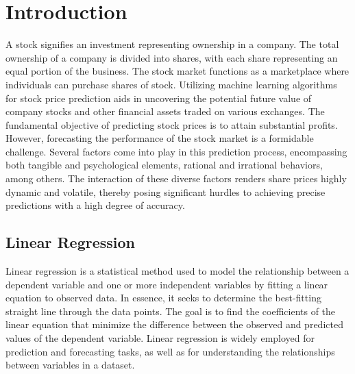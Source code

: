 \documentclass[conference,onecolumn,11pt]{IEEEtran}
\begin{document}
\section{Introduction}
A stock signifies an investment representing ownership in a company. The total ownership of a company is divided into shares, with each share representing an equal portion of the business. The stock market functions as a marketplace where individuals can purchase shares of stock. 
Utilizing machine learning algorithms for stock price prediction aids in uncovering the potential future value of company stocks and other financial assets traded on various exchanges. The fundamental objective of predicting stock prices is to attain substantial profits. However, forecasting the performance of the stock market is a formidable challenge. Several factors come into play in this prediction process, encompassing both tangible and psychological elements, rational and irrational behaviors, among others.
The interaction of these diverse factors renders share prices highly dynamic and volatile, thereby posing significant hurdles to achieving precise predictions with a high degree of accuracy.


\subsection*{Linear Regression}

Linear regression is a statistical method used to model the relationship between a dependent variable and one or more independent variables by fitting a linear equation to observed data. In essence, it seeks to determine the best-fitting straight line through the data points. The goal is to find the coefficients of the linear equation that minimize the difference between the observed and predicted values of the dependent variable. Linear regression is widely employed for prediction and forecasting tasks, as well as for understanding the relationships between variables in a dataset.
\end{document}
